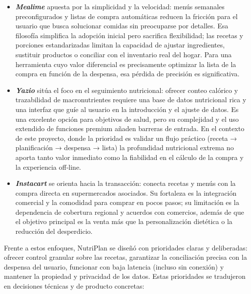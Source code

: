 \documentclass[twoside, openright, 11pt]{report}
\begin{document}
		\begin{itemize}
			\item \textit{\textbf{Mealime}} apuesta por la simplicidad y la velocidad: menús semanales preconfigurados y listas de compra automáticas reducen la fricción para el usuario que busca solucionar comidas sin preocuparse por detalles. Esa filosofía simplifica la adopción inicial pero sacrifica flexibilidad; las recetas y porciones estandarizadas limitan la capacidad de ajustar ingredientes, sustituir productos o conciliar con el inventario real del hogar. Para una herramienta cuyo valor diferencial es precisamente optimizar la lista de la compra en función de la despensa, esa pérdida de precisión es significativa.
			
			\item \textit{\textbf{Yazio}} sitúa el foco en el seguimiento nutricional: ofrecer conteo calórico y trazabilidad de macronutrientes requiere una base de datos nutricional rica y una interfaz que guíe al usuario en la introducción y el ajuste de datos. Es una excelente opción para objetivos de salud, pero su complejidad y el uso extendido de funciones premium añaden barreras de entrada. En el contexto de este proyecto, donde la prioridad es validar un flujo práctico (receta → planificación → despensa → lista) la profundidad nutricional extrema no aporta tanto valor inmediato como la fiabilidad en el cálculo de la compra y la experiencia off‑line.
			\item \textit{\textbf{Instacart}} se orienta hacia la transacción: conecta recetas y menús con la compra directa en supermercados asociados. Su fortaleza es la integración comercial y la comodidad para comprar en pocos pasos; su limitación es la dependencia de cobertura regional y acuerdos con comercios, además de que el objetivo principal es la venta más que la personalización dietética o la reducción del desperdicio.
		\end{itemize}
		  
		Frente a estos enfoques, NutriPlan se diseñó con prioridades claras y deliberadas: ofrecer control granular sobre las recetas, garantizar la conciliación precisa con la despensa del usuario, funcionar con baja latencia (incluso sin conexión) y mantener la propiedad y privacidad de los datos. Estas prioridades se tradujeron en decisiones técnicas y de producto concretas:
		
\end{document}
